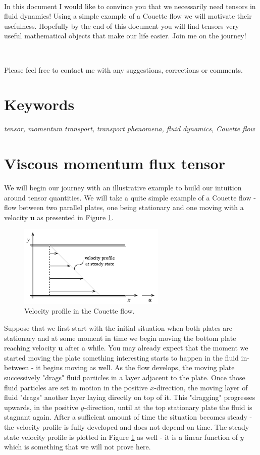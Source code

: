 \documentclass[10pt,twocolumn]{article}
\begin{document}
\,\,

In this document I would like to convince you that we necessarily need tensors in fluid dynamics! Using a simple example of a Couette flow we will motivate their usefulness. Hopefully by the end of this document you will find tensors very useful mathematical objects that make our life easier. Join me on the journey!

\,\,

Please feel free to contact me with any suggestions, corrections or comments.

\section*{Keywords}

\textit{tensor, momentum transport, transport phenomena, fluid dynamics, Couette flow}



\section*{Viscous momentum flux tensor}

We will begin our journey with an illustrative example to build our intuition around tensor quantities. We will take a quite simple example of a Couette flow - flow between two parallel plates, one being stationary and one moving with a velocity $\mathbf{u}$ as presented in Figure \ref{fig:couette-flow}.
\begin{figure}[H]
\centering\includegraphics[width=7cm]{couette-flow.png}
\caption{Velocity profile in the Couette flow.}
\label{fig:couette-flow}
\end{figure}
Suppose that we first start with the initial situation when both plates are stationary and at some moment in time we begin moving the bottom plate reaching velocity $\mathbf{u}$ after a while. You may already expect that the moment we started moving the plate something interesting starts to happen in the fluid in-between - it begins moving as well. As the flow develops, the moving plate successively "drags" fluid particles in a layer adjacent to the plate. Once those fluid particles are set in motion in the positive $x$-direction, the moving layer of fluid "drags" another layer laying directly on top of it. This "dragging" progresses upwards, in the positive $y$-direction, until at the top stationary plate the fluid is stagnant again. After a sufficient amount of time the situation becomes steady - the velocity profile is fully developed and does not depend on time. The steady state velocity profile is plotted in Figure \ref{fig:couette-flow} as well - it is a linear function of $y$ which is something that we will not prove here.
\end{document}

